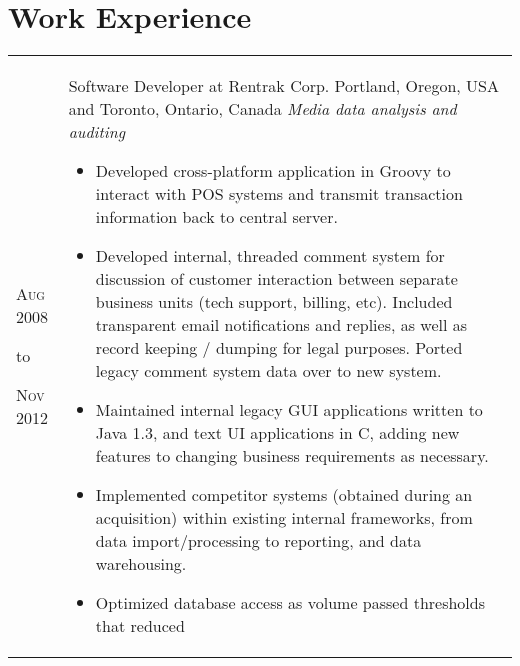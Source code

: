 {{{{{{{{{{{        \section{Work Experience}
        \begin{tabular}{ R{1.5cm} | p{10.5cm} }
            \hfill \textsc{Aug 2008}\newline
            \begin{center} to \end{center}
            \hfill \textsc{Nov 2012} &
                            Software Developer at Rentrak Corp.\newline
                            Portland, Oregon, USA and Toronto, Ontario, Canada\newline
                            \emph{Media data analysis and auditing} \newline
                            \fontsize{9pt}{10pt}\selectfont
                            \begin{itemize}
                                \item Developed cross-platform application in Groovy to interact with POS
                                    systems and transmit transaction information back to central server.
                                \item Developed internal, threaded comment system for discussion of customer
                                    interaction between separate business units (tech support, billing,
                                    etc). Included transparent email notifications and replies, as well as
                                    record keeping / dumping for legal purposes. Ported legacy comment
                                    system data over to new system.
                                \item Maintained internal legacy GUI applications written to Java 1.3, and
                                    text UI applications in C, adding new features to changing business
                                    requirements as necessary.
                                \item Implemented competitor systems (obtained during an acquisition) within
                                    existing internal frameworks, from data import/processing to
                                    reporting, and data warehousing.
                                \item Optimized database access as volume passed thresholds that reduced

\end{itemize}
\end{tabular}}}}}}}}}}}}
